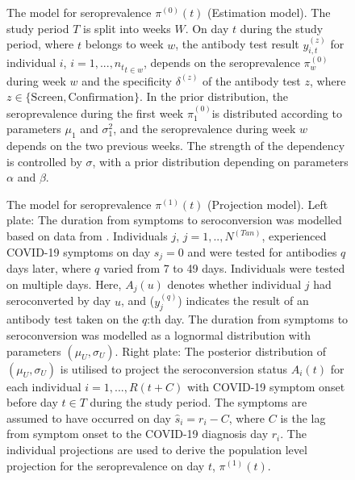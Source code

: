 \newpage

\begin{figure}[!htb]


\caption{The model for seroprevalence $\pi^{(0)}(t)$ (Estimation model). The study period $T$ is split into weeks $W$. On day $t$ during the study period, where $t$ belongs to week $w$, the antibody test result $y^{(z)}_{i, t}$ for individual $i$, $i = {1, ..., n_t}_{t \in w}$, depends on the seroprevalence $\pi^{(0)}_w$ during week $w$ and the specificity $\delta^{(z)}$ of the antibody test $z$, where $z \in \{\text{Screen}, \text{Confirmation}\}$. In the prior distribution, the seroprevalence during the first week $\pi_1^{(0)}$is distributed according to parameters $\mu_1$ and $\sigma_1^2$, and the seroprevalence during week $w$ depends on the two previous weeks. The strength of the dependency is controlled by $\sigma$, with a prior distribution depending on parameters $\alpha$ and $\beta$. } 
\label{fig:model1}

\end{figure}

\newpage

\begin{figure}[!htb]


\caption{The model for seroprevalence $\pi^{(1)}(t)$ (Projection model). Left plate: The duration from symptoms to seroconversion was modelled based on data from \cite{Tan2020}. Individuals $j$, $j = 1, .., N^{(Tan)}$, experienced COVID-19 symptoms on day $s_j = 0$ and were tested for antibodies $q$ days later, where $q$ varied from 7 to 49 days. Individuals were tested on multiple days. Here, $A_j(u)$ denotes whether individual $j$ had seroconverted by day $u$, and ($y_j^{(q)}$) indicates the result of an antibody test taken on the $q$:th day. The duration from symptoms to seroconversion was modelled as a lognormal distribution with parameters $(\mu_U, \sigma_U)$. Right plate: The posterior distribution of $(\mu_U, \sigma_U)$ is utilised to project the seroconversion status $A_i(t)$ for each individual $i = 1, ..., R(t + C)$ with COVID-19 symptom onset before day $t \in T$ during the study period. The symptoms are assumed to have occurred on day $\hat{s}_i = r_i - C$, where $C$ is the lag from symptom onset to the COVID-19 diagnosis day $r_i$. The individual projections are used to derive the population level projection for the seroprevalence on day $t$, $\pi^{(1)}(t)$.} 
\label{fig:model2}

\end{figure}


